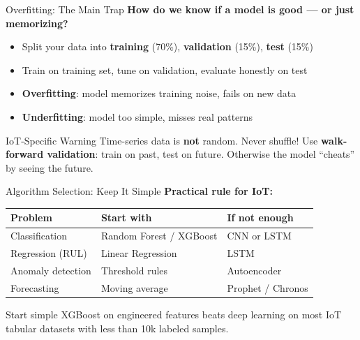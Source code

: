 \documentclass[aspectratio=169,11pt]{beamer}
\begin{document}
\begin{frame}{Overfitting: The Main Trap}
    \textbf{How do we know if a model is good --- or just memorizing?}

    \vspace{0.3cm}
    \begin{itemize}
        \item Split your data into \textbf{training} (70\%), \textbf{validation} (15\%), \textbf{test} (15\%)
        \item Train on training set, tune on validation, evaluate honestly on test
        \item \textbf{Overfitting}: model memorizes training noise, fails on new data
        \item \textbf{Underfitting}: model too simple, misses real patterns
    \end{itemize}

    \vspace{0.3cm}
    \begin{alertblock}{IoT-Specific Warning}
        Time-series data is \textbf{not} random. Never shuffle! Use \textbf{walk-forward validation}: train on past, test on future. Otherwise the model ``cheats'' by seeing the future.
    \end{alertblock}
\end{frame}

\begin{frame}{Algorithm Selection: Keep It Simple}
    \textbf{Practical rule for IoT:}

    \vspace{0.3cm}
    \begin{center}
    \begin{tabular}{lll}
        \toprule
        \textbf{Problem} & \textbf{Start with} & \textbf{If not enough} \\
        \midrule
        Classification & Random Forest / XGBoost & CNN or LSTM \\
        Regression (RUL) & Linear Regression & LSTM \\
        Anomaly detection & Threshold rules & Autoencoder \\
        Forecasting & Moving average & Prophet / Chronos \\
        \bottomrule
    \end{tabular}
    \end{center}

    \vspace{0.3cm}
    \begin{exampleblock}{Start simple}
        XGBoost on engineered features beats deep learning on most IoT tabular datasets with less than 10k labeled samples.
    \end{exampleblock}
\end{frame}
\end{document}
